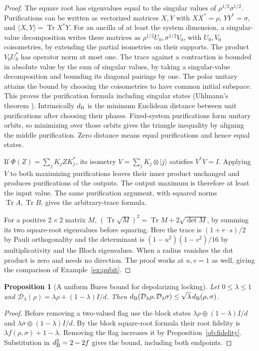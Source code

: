 \documentclass[aps,pra,onecolumn,superscriptaddress,nofootinbib,10pt]{revtex4-2}
\newtheorem{proposition}[theorem]{Proposition}
\theoremstyle{definition}
\theoremstyle{remark}
\newcommand{\tr}{\operatorname{Tr}}
\begin{document}
\begin{proof}
The square root has eigenvalues equal to the singular values of
\(\rho^{1/2}\sigma^{1/2}\). Purifications can be written as vectorized
matrices \(X,Y\) with \(XX^*=\rho\), \(YY^*=\sigma\), and
\(\langle X,Y\rangle=\tr X^*Y\). For an ancilla of at least the system
dimension, a singular-value decomposition writes these matrices as
\(\rho^{1/2}U_0,\sigma^{1/2}V_0\), with \(U_0,V_0\) coisometries, by
extending the partial isometries on their supports. The product
\(V_0U_0^*\) has operator norm at most one. The trace against a
contraction is bounded in absolute value by the sum of singular
values, by taking a singular-value decomposition and bounding its
diagonal pairings by one. The polar unitary attains the bound by
choosing the coisometries to have common initial subspace. This proves
the purification formula including singular states (Uhlmann's theorem
\cite{obr:uhlmannfidelity,obr:jozsa}). Intrinsically \(d_{\rm B}\) is the
minimum Euclidean distance between unit purifications after choosing
their phases. Fixed-system purifications form unitary orbits, so
minimizing over those orbits gives the triangle inequality by aligning
the middle purification. Zero distance means equal purifications
and hence equal states.

If \(\Phi(Z)=\sum_j K_jZK_j^*\), its isometry
\(V=\sum_j K_j\otimes|j\rangle\) satisfies \(V^*V=I\).
Applying \(V\) to both maximizing purifications leaves their inner
product unchanged and produces purifications of the outputs. The
output maximum is therefore at least the input value. The same
purification argument, with squared norms \(\tr A,\tr B\), gives the
arbitrary-trace formula.

For a positive \(2\times2\) matrix \(M\),
\((\tr\sqrt M)^2=\tr M+2\sqrt{\det M}\), by summing its two
square-root eigenvalues before squaring. Here the trace is
\((1+r\cdot s)/2\) by Pauli orthogonality and the determinant is
\((1-u^2)(1-v^2)/16\) by multiplicativity and the Bloch eigenvalues.
When a radius vanishes the dot product is zero and needs no direction.
The proof works at \(u,v=1\) as well, giving the comparison of
Example~\ref{ex:qubit}.
\end{proof}

\begin{proposition}[A uniform Bures bound for depolarizing locking]\label{ob:bureslocking}
Let \(0\le\lambda\le1\) and
\(\mathcal D_\lambda(\rho)=\lambda\rho+(1-\lambda)I/d\).
Then \(d_{\rm B}(\mathcal D_\lambda\rho,\mathcal D_\lambda\sigma)
\le\sqrt\lambda\,d_{\rm B}(\rho,\sigma)\).
\end{proposition}
\begin{proof}
Before removing a two-valued flag use the block states
\(\lambda\rho\oplus(1-\lambda)I/d\) and
\(\lambda\sigma\oplus(1-\lambda)I/d\). By the block square-root
formula their root fidelity is \(\lambda f(\rho,\sigma)+1-\lambda\).
Removing the flag increases it by Proposition~\ref{ob:fidelity}.
Substitution in \(d_{\rm B}^2=2-2f\) gives the bound, including both
endpoints.
\end{proof}
\end{document}
